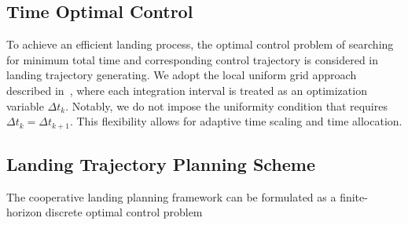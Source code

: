 \documentclass[conference,preprint]{IEEEtran}
\begin{document}
\subsection{Time Optimal Control}
\label{sec:time_optimal_control}
To achieve an efficient landing process, the optimal control problem of searching for minimum total time and corresponding control trajectory is considered in landing trajectory generating. We adopt the local uniform grid approach described in~\cite{Roesmann2021}, where each integration interval is treated as an optimization variable $\Delta t_k$.
Notably, we do not impose the uniformity condition that requires $\Delta t_k = \Delta t_{k+1}$. This flexibility allows for adaptive time scaling and time allocation.

\subsection{Landing Trajectory Planning Scheme}
\label{sec:landing_trajectory_planning_scheme}
The cooperative landing planning framework can be formulated as a finite-horizon discrete optimal control problem
\end{document}
